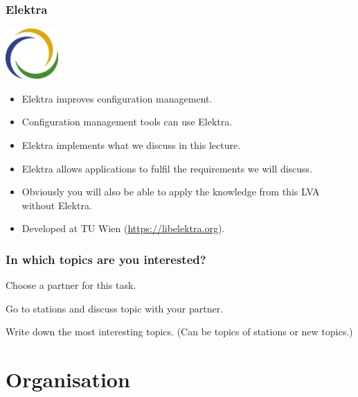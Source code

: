 \begin{frame}
	\frametitle{Elektra}
	\hfill \includegraphics[width=2cm]{../figures/logo}
	\vspace{-1cm}
	\begin{itemize}
		\item Elektra improves configuration management.
		\item Configuration management tools can use Elektra.
		\item Elektra implements what we discuss in this lecture.
		\item Elektra allows applications to fulfil the requirements we will discuss.
		\item Obviously you will also be able to apply the knowledge from this LVA without Elektra.
		\item Developed at TU Wien (\url{https://libelektra.org}).
	\end{itemize}
\end{frame}

\begin{assignment}
	\frametitle{In which topics are you interested?}
	\begin{task}[1]
	Choose a partner for this task.
	\end{task}

	\begin{task}[2]
	Go to stations and discuss topic with your partner.
	\end{task}

	\begin{task}[3]
	Write down the most interesting topics.
	(Can be topics of stations or new topics.)
	\end{task}
\end{assignment}





\section{Organisation}

